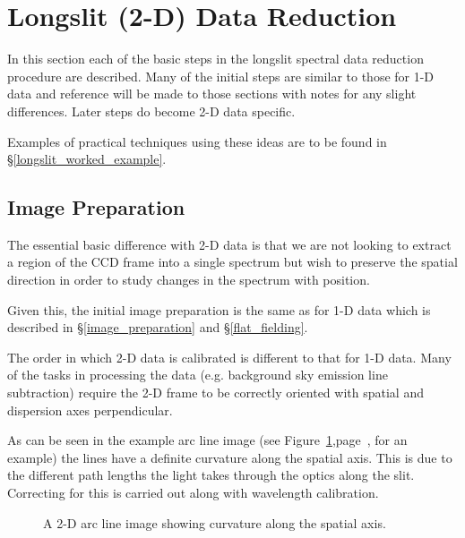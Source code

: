 \documentclass[twoside,11pt]{article}
\newcommand{\stardocinitials}  {SC}
\newcommand{\stardocnumber}    {7.2}
\newcommand{\stardocname}{\stardocinitials /\stardocnumber}
\newcommand{\htmlref}[2]{#1}
\newcommand{\xlabel}[1]{}
\newcommand{\mlabel}[1]{\xlabel{#1}\label{#1}}
\newcommand{\scspec}[2]{#1}
\newcommand{\scspec}[2]{#2}
\begin{document}
\section{\mlabel{longslit_reduction_steps}Longslit (2-D) Data Reduction}
\markboth{Longslit Reduction Steps}{\stardocname}

In this section each of the basic steps in the longslit spectral data reduction
procedure are described. Many of the initial steps are similar to those 
for 1-D data and reference will be made to those sections with notes
for any slight differences. Later steps do become 2-D data specific.

Examples of practical techniques using these ideas are to be found
in \scspec{\S\ref{longslit_worked_example}}
{\htmlref{A 2-D Worked Example}{longslit_worked_example}}.


\subsection{\mlabel{image_long_preparation}Image Preparation}

The essential basic difference with 2-D data is that we are not
looking to extract a region of the CCD frame into a single spectrum
but wish to preserve the spatial direction in order to study changes
in the spectrum with position.

Given this, the initial image preparation is the same as for 1-D data
which is described in \scspec{\S\ref{image_preparation}}
{\htmlref{{\sl Image Preparation}}{image_preparation}} and 
 \scspec{\S\ref{flat_fielding}}
{\htmlref{Flat Fielding}{flat_fielding}}.



The order in which 2-D data is calibrated is different to that for 1-D 
data. Many of the tasks in processing the data (e.g. background sky
emission line subtraction) require the 2-D frame to be correctly
oriented with spatial and dispersion axes perpendicular.

As can be seen in the example arc line image (see
\scspec{Figure~\ref{arc_line_curve},page~\pageref{arc_line_curve},}{the 
figure below} for an example) the
lines have a definite curvature along the spatial axis. This is due to
the different path lengths the light takes through the optics along
the slit. Correcting for this is carried out along with wavelength
calibration.

\begin{figure}
\begin{center}
  \scspec{\leavevmode\epsfysize=105mm\epsfbox{sc7_13.eps}}
         {\leavevmode\epsfysize=136mm}

  \parbox{140mm}{
    \caption{A 2-D arc line image showing curvature along the spatial axis.}
    \label{arc_line_curve}
  }
\end{center}
\end{figure}
\end{document}
